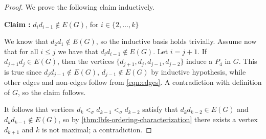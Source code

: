 \documentclass{svproc}
\begin{document}
\begin{proof}
We prove the following claim inductively. 

\noindent\textbf{Claim :} $d_id_{i-1}\notin E(G)$, for $i\in \{2, \dots, k\}$

We know that $d_2d_1\notin E(G)$, so the inductive basis holds trivially. Assume now that for all $i\le j$ we have that $d_id_{i-1}\notin E(G)$. Let $i=j+1$. If $d_{j+1}d_j\in E(G)$, then the vertices $\{d_{j+1},d_j,d_{j-1},d_{j-2}\}$ induce a $P_4$ in $G$. This is true since $d_jd_{j-1}\notin E(G)$, $d_{j-1}\notin E(G)$ by inductive hypothesis, while other edges and non-edges follow from \ref{eqn:edges}. A contradiction with definition of $G$, so the claim follows.
 
It follows that vertices $d_k<_\sigma d_{k-1}<_\sigma d_{k-2}$ satisfy that $d_kd_{k-2}\in E(G)$ and $d_kd_{k-1}\notin E(G)$, so by \cref{thm:lbfs-ordering-characterization} there exists a vertex $d_{k+1}$ and $k$ is not maximal; a contradiction. 

\end{proof}
\end{document}
